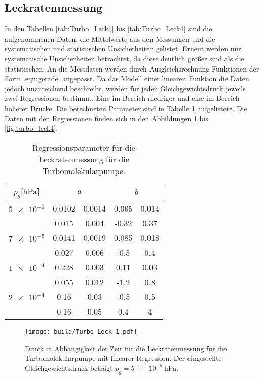 \subsection{Leckratenmessung}
In den Tabellen \ref{tab:Turbo_Leck1} bis \ref{tab:Turbo_Leck4} sind die aufgenommenen Daten, die 
Mittelwerte aus den Messungen und die systematischen und statistischen Unsicherheiten gelistet.
Erneut werden nur systematische Unsicherheiten betrachtet, da diese deutlich größer sind als die 
statistischen. 
An die Messdaten werden durch Ausgleichsrechnung Funktionen der Form \ref{eqn:gerade} angepasst.
Da das Modell einer linearen Funktion die Daten jedoch unzureichend beschreibt, werden 
für jeden Gleichgewichtsdruck jeweils zwei Regressionen bestimmt. Eine im Bereich niedriger 
und eine im Bereich höherer Drücke. Die berechneten Parameter sind in Tabelle \ref{tab:Turbo_Leck_para}
aufgelistete. Die Daten mit den Regressionen finden sich in den Abbildungen \ref{fig:turbo_leck1} 
bis \ref{fig:turbo_leck4}.
\begin{table}[H]
    \centering
      \caption{Regressionsparameter für die Leckratenmessung für die Turbomolekularpumpe.}
      \label{tab:Turbo_Leck_para}
      \begin{tabular}{c c @{${}\pm{}$} c c @{${}\pm{}$} c}
        \toprule
        {$p_g [\si{\hecto\pascal}$]} & \multicolumn{2}{c}{$a$} & \multicolumn{2}{c}{$b$} \\
        \midrule
        $\num{5e-5}$  & 0.0102 & 0.0014 & 0.065 & 0.014\\
                      & 0.015  & 0.004  & -0.32 & 0.37 \\
        \midrule
        $\num{7e-5}$  & 0.0141 & 0.0019 & 0.085 & 0.018\\
                      & 0.027  & 0.006  & -0.5  & 0.4  \\
        \midrule
        $\num{1e-4}$  & 0.228  & 0.003  & 0.11  & 0.03 \\
                      & 0.055  & 0.012  & -1.2  & 0.8  \\
        \midrule
        $\num{2e-4}$  & 0.16   & 0.03   & -0.5  & 0.5  \\
                      & 0.16   & 0.05   & 0.4   & 4    \\
        \bottomrule
      \end{tabular}
\end{table}
\begin{figure}[H]
    \centering
    \texttt{[image: build/Turbo\_Leck\_1.pdf]}
    \caption{Druck in Abhängigkeit der Zeit für die Leckratenmessung für die Turbomolekularpumpe mit linearer Regression. Der eingestellte Gleichgewichtsdruck beträgt $p_g=\SI{5e-5}{\hecto\pascal}$.}
    \label{fig:turbo_leck1}
\end{figure}
